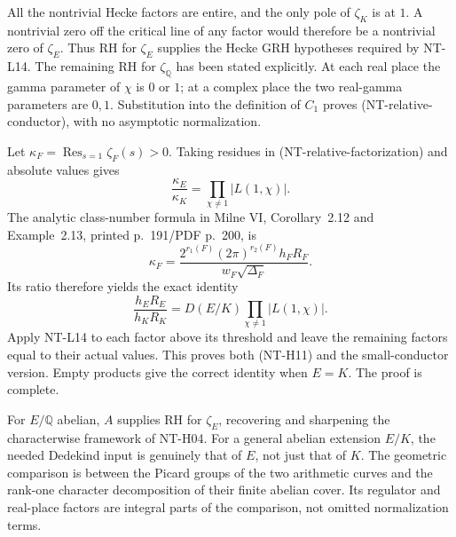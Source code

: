 \documentclass[11pt,a4paper]{article}
\begin{document}
All the nontrivial Hecke factors are entire, and the only pole
of $\zeta_K$ is at $1$.  A nontrivial zero off the critical
line of any factor would therefore be a nontrivial zero of
$\zeta_E$.  Thus RH for $\zeta_E$ supplies the Hecke GRH
hypotheses required by NT-L14.  The remaining RH for
$\zeta_{\mathbb Q}$ has been stated explicitly.
At each real place the gamma parameter of $\chi$ is $0$ or $1$;
at a complex place the two real-gamma parameters are $0,1$.
Substitution into the definition of $C_1$ proves
(NT-relative-conductor), with no asymptotic normalization.

Let $\kappa_F=\operatorname{Res}_{s=1}\zeta_F(s)>0$.
Taking residues in (NT-relative-factorization) and absolute
values gives
\[
 \frac{\kappa_E}{\kappa_K}
                  =\prod_{\chi\ne1}|L(1,\chi)|.
\]
The analytic class-number formula in Milne VI,
Corollary~2.12 and Example~2.13, printed p.~191/PDF p.~200,
is
\[
 \kappa_F=\frac{2^{r_1(F)}(2\pi)^{r_2(F)}h_FR_F}
                         {w_F\sqrt{\Delta_F}}.
\]
Its ratio therefore yields the exact identity
\[
 \frac{h_ER_E}{h_KR_K}
             =D(E/K)\prod_{\chi\ne1}|L(1,\chi)|.
\]
Apply NT-L14 to each factor above its threshold and leave the
remaining factors equal to their actual values.  This proves
both (NT-H11) and the small-conductor version.
Empty products give the correct identity when $E=K$.
The proof is complete.

For $E/\mathbb Q$ abelian, $A$ supplies RH for $\zeta_E$,
recovering and sharpening the characterwise framework of NT-H04.
For a general abelian extension $E/K$, the needed Dedekind
input is genuinely that of $E$, not just that of $K$.
The geometric comparison is between the Picard groups of the
two arithmetic curves and the rank-one character decomposition
of their finite abelian cover.  Its regulator and real-place
factors are integral parts of the comparison, not omitted
normalization terms.
\end{document}
